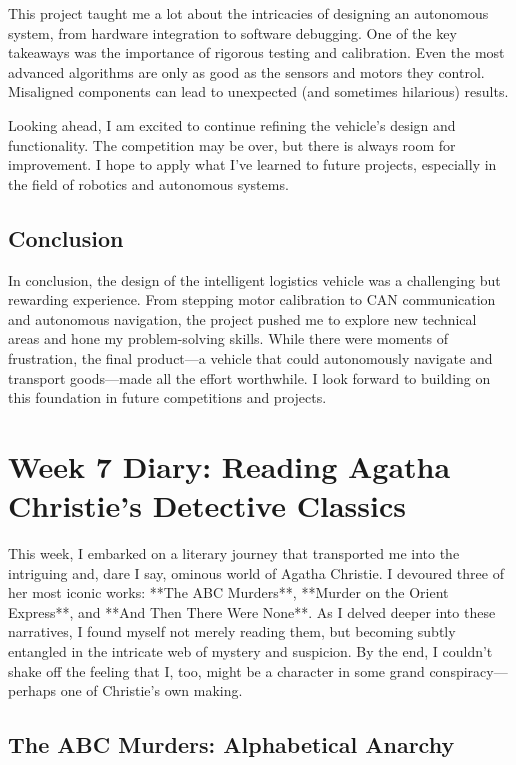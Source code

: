 \documentclass[a4paper]{article} 	%
\begin{document}
This project taught me a lot about the intricacies of designing an autonomous system, from hardware integration to software debugging. One of the key takeaways was the importance of rigorous testing and calibration. Even the most advanced algorithms are only as good as the sensors and motors they control. Misaligned components can lead to unexpected (and sometimes hilarious) results.

Looking ahead, I am excited to continue refining the vehicle’s design and functionality. The competition may be over, but there is always room for improvement. I hope to apply what I’ve learned to future projects, especially in the field of robotics and autonomous systems.

\subsection*{Conclusion}

In conclusion, the design of the intelligent logistics vehicle was a challenging but rewarding experience. From stepping motor calibration to CAN communication and autonomous navigation, the project pushed me to explore new technical areas and hone my problem-solving skills. While there were moments of frustration, the final product—a vehicle that could autonomously navigate and transport goods—made all the effort worthwhile. I look forward to building on this foundation in future competitions and projects.



\section{Week 7 Diary: Reading Agatha Christie’s Detective Classics}

This week, I embarked on a literary journey that transported me into the intriguing and, dare I say, ominous world of Agatha Christie. I devoured three of her most iconic works: **The ABC Murders**, **Murder on the Orient Express**, and **And Then There Were None**. As I delved deeper into these narratives, I found myself not merely reading them, but becoming subtly entangled in the intricate web of mystery and suspicion. By the end, I couldn't shake off the feeling that I, too, might be a character in some grand conspiracy—perhaps one of Christie's own making.

\subsection*{The ABC Murders: Alphabetical Anarchy}
\end{document}
